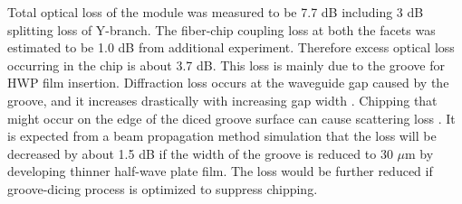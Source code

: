 \documentclass[letterpaper, 10pt]{article}
\begin{document}
Total optical  loss of the module was measured to be 7.7 dB including 3 dB splitting loss of Y-branch.
The fiber-chip coupling loss at both the facets was estimated to be 1.0 dB from additional experiment.
Therefore excess optical loss occurring in the chip is about 3.7 dB.
This loss is mainly due to the groove for HWP film insertion.
Diffraction loss occurs at the waveguide gap caused by the groove, and it increases drastically with increasing gap width \cite{Inoue:1997es}.
Chipping that might occur on the edge of the diced groove surface can cause scattering loss \cite{Carpenter:2013fh}.
It is expected from a beam propagation method simulation that the loss will be decreased by about 1.5 dB if the width of the groove is reduced to 30 $\mu$m by developing thinner half-wave plate film.
The loss would be further reduced if groove-dicing process is optimized to suppress chipping.

\end{document}
